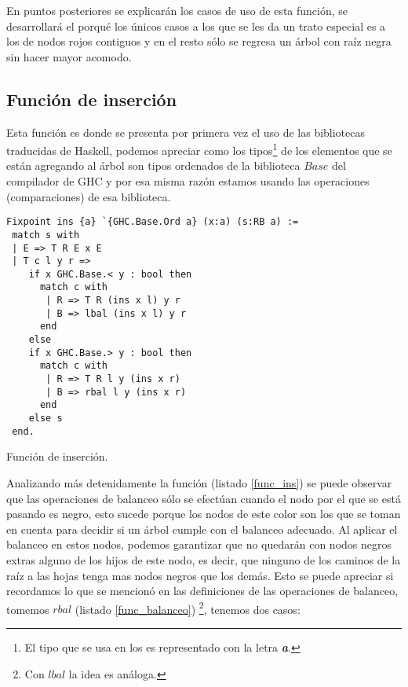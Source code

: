 En puntos posteriores se explicar\'an los casos de uso de esta función, se desarrollar\'a el 
porqu\'e los \'unicos casos a los que se les da un trato especial es a los de nodos rojos contiguos
y en el resto s\'olo se regresa un \'arbol con ra\'iz negra sin hacer mayor acomodo.

\subsection {Funci\'on de inserci\'on}
Esta funci\'on es donde se presenta por primera vez el uso de las bibliotecas traducidas de
Haskell, podemos apreciar como los tipos\footnote{El tipo que se usa en los {\arns} es representado 
con la letra \textbf{\textit{a}}.} de los elementos que se est\'an agregando al \'arbol son tipos
ordenados de la biblioteca $Base$ del compilador de GHC y por esa misma raz\'on estamos usando las
operaciones (comparaciones) de esa biblioteca.

\begin{listing}[!ht]
\centering
\captionsetup{justification=centering}
\begin{verbatim}
Fixpoint ins {a} `{GHC.Base.Ord a} (x:a) (s:RB a) :=
 match s with
 | E => T R E x E
 | T c l y r =>
    if x GHC.Base.< y : bool then
      match c with
       | R => T R (ins x l) y r
       | B => lbal (ins x l) y r
      end
    else
    if x GHC.Base.> y : bool then
      match c with
       | R => T R l y (ins x r)
       | B => rbal l y (ins x r)
      end
    else s
 end.
\end{verbatim}
\caption{Funci\'on de inserci\'on.}
\label{func_ins}
\end{listing}

Analizando m\'as detenidamente la funci\'on (listado \ref{func_ins}) se puede observar que las
operaciones de balanceo s\'olo se efectúan cuando el nodo por el que se est\'a pasando es negro, esto
sucede porque los nodos de este color son los que se toman en cuenta para decidir si
un \'arbol cumple con el balanceo adecuado. Al aplicar el balanceo en estos nodos, podemos 
garantizar que no quedar\'an con nodos negros extras alguno de los hijos de este nodo, es decir, que
ninguno de los caminos de la ra\'iz a las hojas tenga mas nodos negros que los demás. Esto se puede
apreciar si recordamos lo que se mencion\'o en las definiciones de las operaciones de balanceo, 
tomemos \hyperref[func_balanceo]{$rbal$} (listado \ref{func_balanceo})
\footnote{Con \hyperref[func_balanceo]{$lbal$} la idea es an\'aloga.}, tenemos dos casos:


